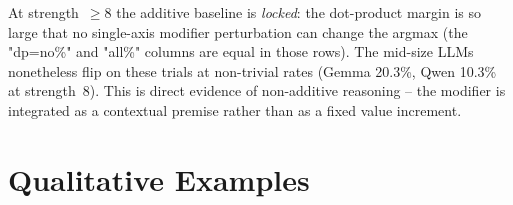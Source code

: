\documentclass[11pt]{article}
\begin{document}
\begin{table}[t]
\centering
\footnotesize
\setlength{\tabcolsep}{4pt}
\caption{Impossible-flip rate as a function of profile strength for the three LLMs. ``rate$_{\text{all}}$'' is the impossible-flip count divided by all trials at that strength; ``rate$_{\text{dp=no}}$'' is divided only by trials where the dot-product baseline did not flip (a tighter conditional). Gemma and Qwen both peak in the impossible regime (strength~8), while LLaMA 3.1 8B does not.}
\label{tab:impossible}
\end{table}

At strength~$\geq 8$ the additive baseline is \emph{locked}: the dot-product margin is so large that no single-axis modifier perturbation can change the argmax (the "dp=no\%" and "all\%" columns are equal in those rows). The mid-size LLMs nonetheless flip on these trials at non-trivial rates (Gemma 20.3\%, Qwen 10.3\% at strength~8). This is direct evidence of non-additive reasoning -- the modifier is integrated as a contextual premise rather than as a fixed value increment.

\section{Qualitative Examples}
\label{app:qualitative}
\end{document}
